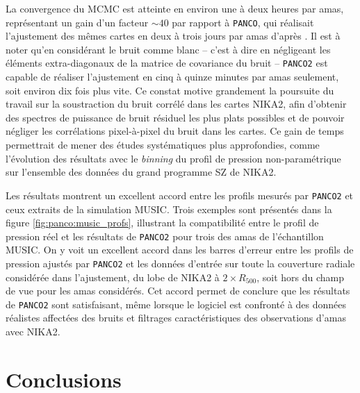 La convergence du MCMC est atteinte en environ une à deux heures par amas, représentant un gain d'un facteur $\sim 40$ par rapport à \texttt{PANCO}, qui réalisait l'ajustement des mêmes cartes en deux à trois jours par amas d'après \footnotemark.
Il est à noter qu'en considérant le bruit comme blanc -- c'est à dire en négligeant les éléments extra-diagonaux de la matrice de covariance du bruit -- \texttt{PANCO2} est capable de réaliser l'ajustement en cinq à quinze minutes par amas seulement, soit environ dix fois plus vite.
Ce constat motive grandement la poursuite du travail sur la soustraction du bruit corrélé dans les cartes NIKA2, afin d'obtenir des spectres de puissance de bruit résiduel les plus plats possibles et de pouvoir négliger les corrélations pixel-à-pixel du bruit dans les cartes.
Ce gain de temps permettrait de mener des études systématiques plus approfondies, comme l'évolution des résultats avec le \textit{binning} du profil de pression non-paramétrique sur l'ensemble des données du grand programme SZ de NIKA2.

Les résultats montrent un excellent accord entre les profils mesurés par \texttt{PANCO2} et ceux extraits de la simulation MUSIC.
Trois exemples sont présentés dans la figure \ref{fig:panco:music_profs}, illustrant la compatibilité entre le profil de pression réel et les résultats de \texttt{PANCO2} pour trois des amas de l'échantillon MUSIC.
On y voit un excellent accord dans les barres d'erreur entre les profils de pression ajustés par \texttt{PANCO2} et les données d'entrée sur toute la couverture radiale considérée dans l'ajustement, du lobe de NIKA2 à $2 \times R_{500}$, soit hors du champ de vue pour les amas considérés.
Cet accord permet de conclure que les résultats de \texttt{PANCO2} sont satisfaisant, même lorsque le logiciel est confronté à des données réalistes affectées des bruits et filtrages caractéristiques des observations d'amas avec NIKA2.

\section{Conclusions}

